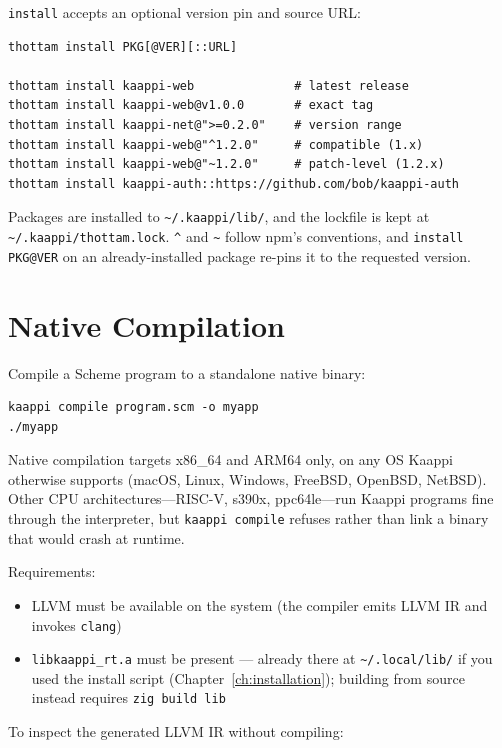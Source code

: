 \texttt{install} accepts an optional version pin and source URL:

\begin{Verbatim}[fontsize=\small]
thottam install PKG[@VER][::URL]

thottam install kaappi-web              # latest release
thottam install kaappi-web@v1.0.0       # exact tag
thottam install kaappi-net@">=0.2.0"    # version range
thottam install kaappi-web@"^1.2.0"     # compatible (1.x)
thottam install kaappi-web@"~1.2.0"     # patch-level (1.2.x)
thottam install kaappi-auth::https://github.com/bob/kaappi-auth
\end{Verbatim}

Packages are installed to \texttt{\textasciitilde/.kaappi/lib/}, and the lockfile is kept at \nolinkurl{~/.kaappi/thottam.lock}. \texttt{\^{}} and \texttt{\~{}} follow npm's conventions, and \texttt{install PKG@VER} on an already-installed package re-pins it to the requested version.

\section{Native Compilation}

Compile a Scheme program to a standalone native binary:

\begin{Verbatim}[fontsize=\small]
kaappi compile program.scm -o myapp
./myapp
\end{Verbatim}

Native compilation targets x86\_64 and ARM64 only, on any OS Kaappi otherwise supports (macOS, Linux, Windows, FreeBSD, OpenBSD, NetBSD). Other CPU architectures---RISC-V, s390x, ppc64le---run Kaappi programs fine through the interpreter, but \texttt{kaappi compile} refuses rather than link a binary that would crash at runtime.

Requirements:
\begin{itemize}
    \item LLVM must be available on the system (the compiler emits LLVM IR and invokes \texttt{clang})
    \item \texttt{libkaappi\_rt.a} must be present --- already there at \texttt{\textasciitilde/.local/lib/} if you used the install script (Chapter~\ref{ch:installation}); building from source instead requires \texttt{zig build lib}
\end{itemize}

To inspect the generated LLVM IR without compiling:

